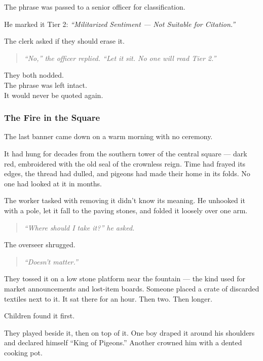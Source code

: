 \documentclass[12pt]{article}
\begin{document}
The phrase was passed to a senior officer for classification.

He marked it Tier 2: \textit{“Militarized Sentiment --- Not Suitable for Citation.”}

The clerk asked if they should erase it.

\begin{quote}
\textit{“No,” the officer replied. “Let it sit. No one will read Tier 2.”}
\end{quote}

They both nodded.\\
The phrase was left intact.\\
It would never be quoted again.

\dotfill

\subsubsection*{The Fire in the Square}

The last banner came down on a warm morning with no ceremony.

It had hung for decades from the southern tower of the central square --- dark red, embroidered with the old seal of the crownless reign. Time had frayed its edges, the thread had dulled, and pigeons had made their home in its folds. No one had looked at it in months.

The worker tasked with removing it didn't know its meaning. He unhooked it with a pole, let it fall to the paving stones, and folded it loosely over one arm.

\begin{quote}
\textit{“Where should I take it?” he asked.}
\end{quote}

The overseer shrugged.

\begin{quote}
\textit{“Doesn’t matter.”}
\end{quote}

They tossed it on a low stone platform near the fountain --- the kind used for market announcements and lost-item boards. Someone placed a crate of discarded textiles next to it. It sat there for an hour. Then two. Then longer.

Children found it first.

They played beside it, then on top of it. One boy draped it around his shoulders and declared himself “King of Pigeons.” Another crowned him with a dented cooking pot.
\end{document}
